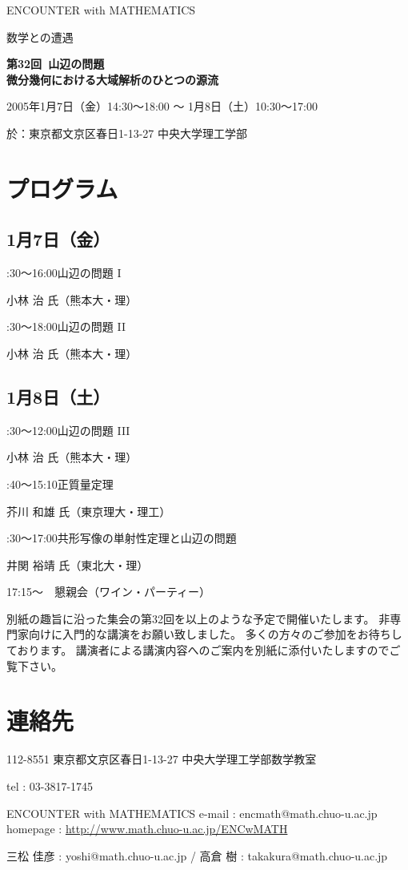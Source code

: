 \documentclass[uplatex,dvipdfmx]{jlreq}
\newcommand{\talk}[3]{%
\noindent
#1\quad #2\par
\hspace*{2em}#3\par\smallskip
}
\newcommand{\EwMnumber}{第32回}
\newcommand{\EwMtitle}{山辺の問題\\[2mm]\large 微分幾何における大域解析のひとつの源流}
\newcommand{\EwMdate}{2005年1月7日（金）14:30～18:00 ～ 1月8日（土）10:30～17:00}
\newcommand{\EwMplace}{東京都文京区春日1-13-27 中央大学理工学部}
\newcommand{\EwMtitleblock}{

\vspace*{-5mm}

\begin{center}

{\Large ENCOUNTER with MATHEMATICS}

\vspace{2mm}

{\large 数学との遭遇}

\vspace{4mm}

{\Large \bfseries \EwMnumber\ \EwMtitle}

\vspace{4mm}

\EwMdate

\vspace{2mm}

於：\EwMplace

\end{center}

\vspace{2mm}

}
\begin{document}
\EwMtitleblock


\section*{プログラム}

\subsection*{1月7日（金）}

\talk
{14:30～16:00}
{山辺の問題 I}
{小林 治 氏（熊本大・理）}

\talk
{16:30～18:00}
{山辺の問題 II}
{小林 治 氏（熊本大・理）}

\subsection*{1月8日（土）}

\talk
{10:30～12:00}
{山辺の問題 III}
{小林 治 氏（熊本大・理）}

\talk
{13:40～15:10}
{正質量定理}
{芥川 和雄 氏（東京理大・理工）}

\talk
{15:30～17:00}
{共形写像の単射性定理と山辺の問題}
{井関 裕靖 氏（東北大・理）}

\bigskip

17:15～　懇親会（ワイン・パーティー）


\bigskip

別紙の趣旨に沿った集会の第32回を以上のような予定で開催いたします。  
非専門家向けに入門的な講演をお願い致しました。  
多くの方々のご参加をお待ちしております。  
講演者による講演内容へのご案内を別紙に添付いたしますのでご覧下さい。


\section*{連絡先}

112-8551 東京都文京区春日1-13-27 中央大学理工学部数学教室 

tel : 03-3817-1745  

ENCOUNTER with MATHEMATICS  
e-mail : encmath@math.chuo-u.ac.jp  
homepage : \url{http://www.math.chuo-u.ac.jp/ENCwMATH}  

三松 佳彦 : yoshi@math.chuo-u.ac.jp / 高倉 樹 : takakura@math.chuo-u.ac.jp
\end{document}
